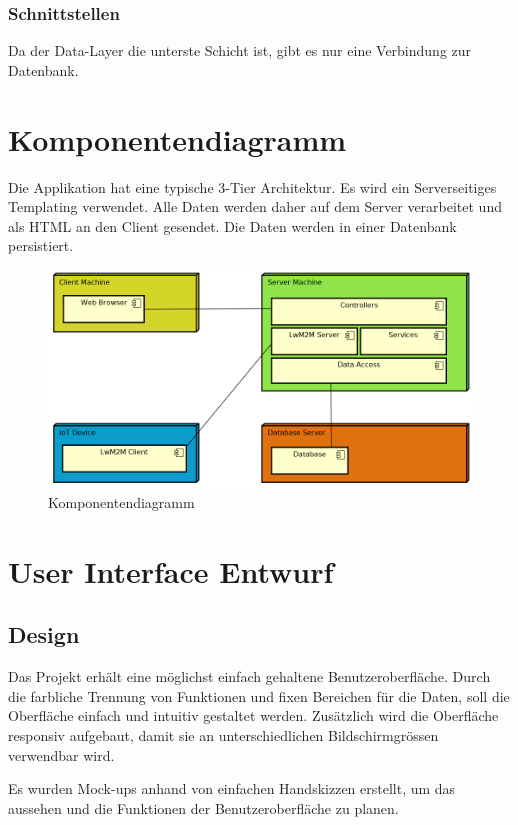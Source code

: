 \subsubsection{Schnittstellen}
Da der Data-Layer die unterste Schicht ist, gibt es nur eine Verbindung zur Datenbank.

\newpage

\section{Komponentendiagramm}
Die Applikation hat eine typische 3-Tier Architektur. Es wird ein Serverseitiges Templating verwendet. Alle Daten werden daher auf dem Server verarbeitet und als HTML an den Client gesendet. Die Daten werden in einer Datenbank persistiert.
\begin{figure}[H]
\center
\includegraphics[scale=0.6]{../03_Design/images/architekturuebersicht}\caption{Komponentendiagramm}
\end{figure}

\section{User Interface Entwurf}
\label{sec:mockups}
\subsection{Design}
Das Projekt erhält eine möglichst einfach gehaltene Benutzeroberfläche. Durch die farbliche Trennung von Funktionen und fixen Bereichen für die Daten, soll die Oberfläche einfach und intuitiv gestaltet werden. Zusätzlich wird die Oberfläche responsiv aufgebaut, damit sie an unterschiedlichen Bildschirmgrössen verwendbar wird.

Es wurden Mock-ups anhand von einfachen Handskizzen erstellt, um das aussehen und die Funktionen der Benutzeroberfläche zu planen.

